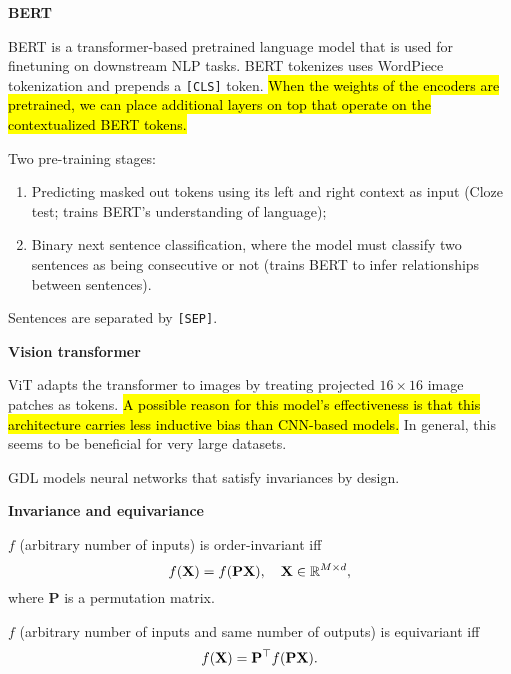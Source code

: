 \documentclass[10pt]{article}
\newenvironment{topic}[1]
{\textbf{\sffamily \footnotesize \colorbox{black}{\rlap{\textbf{\textcolor{white}{#1}}}\hspace{\linewidth}\hspace{-2\fboxsep}}}}
{}
\newenvironment{subtopic}[1]
{\begin{center}\textbf{\footnotesize \sffamily #1}\end{center}}
{}
\renewcommand{\mat}[1]{\ensuremath{\mathbf{#1}}}
\begin{document}
\begin{multicols*}{3}
\begin{topic}{Transformers}
        \begin{subtopic}{BERT}
            BERT is a transformer-based pretrained language model that is used for finetuning on
            downstream NLP tasks. BERT tokenizes uses WordPiece tokenization and prepends a
            \texttt{[CLS]} token. \hl{When the weights of the encoders are pretrained, we can place
            additional layers on top that operate on the contextualized BERT tokens.}

            Two pre-training stages:
            \begin{enumerate}[left=0pt]
                \item Predicting masked out tokens using its left and right context as input (Cloze test; trains BERT's
                      understanding of language);
                \item Binary next sentence classification, where the model must classify two sentences as being
                      consecutive or not (trains BERT to infer relationships between sentences).
            \end{enumerate}
            Sentences are separated by \texttt{[SEP]}.
        \end{subtopic}

        \begin{subtopic}{Vision transformer}
            ViT adapts the transformer to images by treating projected $16 \times 16$ image patches
            as tokens. \hl{A possible reason for this model's effectiveness is that this architecture
            carries less inductive bias than CNN-based models.} In general, this seems to be beneficial
            for very large datasets.
        \end{subtopic}

    \end{topic}

    \begin{topic}{Geometric deep learning}
        GDL models neural networks that satisfy invariances by design.

        \begin{subtopic}{Invariance and equivariance}
            $f$ (arbitrary number of inputs) is order-invariant iff \[
                f(\mat{X}) = f(\mat{P}\mat{X}), \quad \mat{X} \in \R^{M \times d},
            \]
            where $\mat{P}$ is a permutation matrix.

            $f$ (arbitrary number of inputs and same number of outputs) is equivariant iff \[
                f(\mat{X}) = \transpose{\mat{P}} f(\mat{P} \mat{X}).
            \]


\end{subtopic}
\end{topic}
\end{multicols*}
\end{document}
